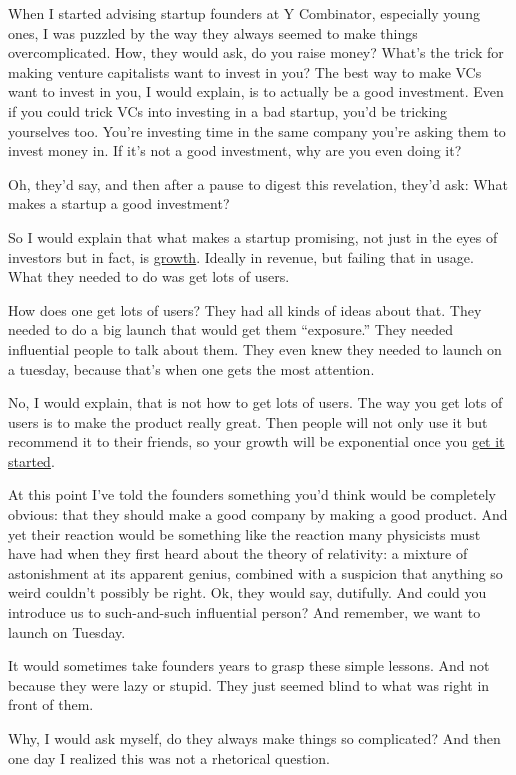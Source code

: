 \documentclass[12pt]{book}
\begin{document}
When I started advising startup founders at Y Combinator, especially
young ones, I was puzzled by the way they always seemed to make things
overcomplicated. How, they would ask, do you raise money? What's the
trick for making venture capitalists want to invest in you? The best way
to make VCs want to invest in you, I would explain, is to actually be a
good investment. Even if you could trick VCs into investing in a bad
startup, you'd be tricking yourselves too. You're investing time in the
same company you're asking them to invest money in. If it's not a good
investment, why are you even doing it?

Oh, they'd say, and then after a pause to digest this revelation, they'd
ask: What makes a startup a good investment?

So I would explain that what makes a startup promising, not just in the
eyes of investors but in fact, is \href{growth.html}{growth}. Ideally in
revenue, but failing that in usage. What they needed to do was get lots
of users.

How does one get lots of users? They had all kinds of ideas about that.
They needed to do a big launch that would get them ``exposure.'' They
needed influential people to talk about them. They even knew they needed
to launch on a tuesday, because that's when one gets the most attention.

No, I would explain, that is not how to get lots of users. The way you
get lots of users is to make the product really great. Then people will
not only use it but recommend it to their friends, so your growth will
be exponential once you \href{ds.html}{get it started}.

At this point I've told the founders something you'd think would be
completely obvious: that they should make a good company by making a
good product. And yet their reaction would be something like the
reaction many physicists must have had when they first heard about the
theory of relativity: a mixture of astonishment at its apparent genius,
combined with a suspicion that anything so weird couldn't possibly be
right. Ok, they would say, dutifully. And could you introduce us to
such-and-such influential person? And remember, we want to launch on
Tuesday.

It would sometimes take founders years to grasp these simple lessons.
And not because they were lazy or stupid. They just seemed blind to what
was right in front of them.

Why, I would ask myself, do they always make things so complicated? And
then one day I realized this was not a rhetorical question.
\end{document}
